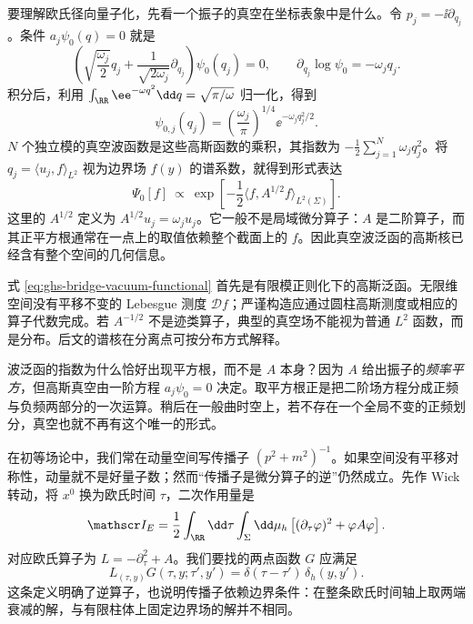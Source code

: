 要理解欧氏径向量子化，先看一个振子的真空在坐标表象中是什么。令 $p_j=-\ii\partial_{q_j}$。条件 $a_j\psi_0(q)=0$ 就是
\[
 \left(\sqrt{\frac{\omega_j}{2}}q_j+\frac1{\sqrt{2\omega_j}}\partial_{q_j}\right)\psi_0(q_j)=0,
 \qquad \partial_{q_j}\log\psi_0=-\omega_jq_j.
\]
积分后，利用 $\int_\RR\ee^{-\omega q^2}\dd q=\sqrt{\pi/\omega}$ 归一化，得到
\begin{equation}\label{eq:ghs-bridge-vacuum-one-mode}
 \psi_{0,j}(q_j)=\left(\frac{\omega_j}{\pi}\right)^{1/4}\ee^{-\omega_jq_j^2/2}.
\end{equation}
$N$ 个独立模的真空波函数是这些高斯函数的乘积，其指数为 $-\frac12\sum_{j=1}^{N}\omega_jq_j^2$。将 $q_j=\langle u_j,f\rangle_{L^2}$ 视为边界场 $f(y)$ 的谱系数，就得到形式表达
\begin{equation}\label{eq:ghs-bridge-vacuum-functional}
 \Psi_0[f]\ \propto\
 \exp\left[-\frac12\langle f,A^{1/2}f\rangle_{L^2(\Sigma)}\right].
\end{equation}
这里的 $A^{1/2}$ 定义为 $A^{1/2}u_j=\omega_ju_j$。它一般不是局域微分算子：$A$ 是二阶算子，而其正平方根通常在一点上的取值依赖整个截面上的 $f$。因此真空波泛函的高斯核已经含有整个空间的几何信息。



式 \cref{eq:ghs-bridge-vacuum-functional} 首先是有限模正则化下的高斯泛函。无限维空间没有平移不变的 Lebesgue 测度 $\mathcal Df$；严谨构造应通过圆柱高斯测度或相应的算子代数完成。若 $A^{-1/2}$ 不是迹类算子，典型的真空场不能视为普通 $L^2$ 函数，而是分布。后文的谱核在分离点可按分布方式解释。



波泛函的指数为什么恰好出现平方根，而不是 $A$ 本身？因为 $A$ 给出振子的\emph{频率平方}，但高斯真空由一阶方程 $a_j\psi_0=0$ 决定。取平方根正是把二阶场方程分成正频与负频两部分的一次运算。稍后在一般曲时空上，若不存在一个全局不变的正频划分，真空也就不再有这个唯一的形式。


在初等场论中，我们常在动量空间写传播子 $(p^2+m^2)^{-1}$。如果空间没有平移对称性，动量就不是好量子数；然而“传播子是微分算子的逆”仍然成立。先作 Wick 转动，将 $x^0$ 换为欧氏时间 $\tau$，二次作用量是
\begin{equation}\label{eq:ghs-bridge-Euclidean-action}
 \mathscr I_E=\frac12\int_{\RR}\dd\tau\int_\Sigma\dd\mu_h
 \left[(\partial_\tau\varphi)^2+\varphi A\varphi\right].
\end{equation}
对应欧氏算子为 $L=-\partial_\tau^2+A$。我们要找的两点函数 $G$ 应满足
\begin{equation}\label{eq:ghs-bridge-green-equation}
 L_{(\tau,y)}G(\tau,y;\tau',y')
 =\delta(\tau-\tau')\,\delta_h(y,y').
\end{equation}
这条定义明确了逆算子，也说明传播子依赖边界条件：在整条欧氏时间轴上取两端衰减的解，与有限柱体上固定边界场的解并不相同。

